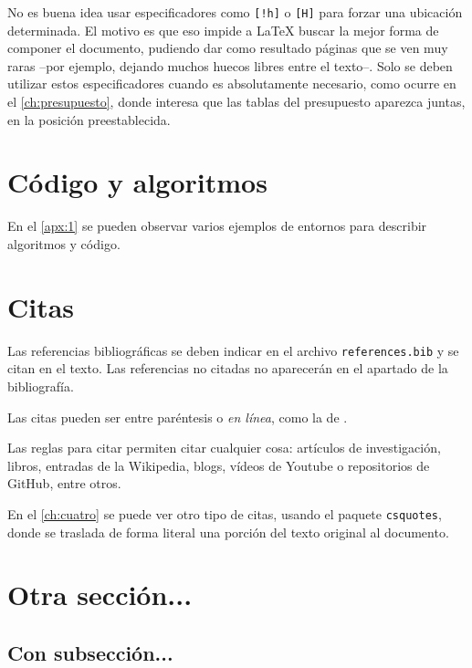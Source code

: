 No es buena idea usar especificadores como \verb|[!h]| o \verb|[H]| para forzar una ubicación determinada. El motivo es que eso impide a \LaTeX{} buscar la mejor forma de componer el documento, pudiendo dar como resultado páginas que se ven muy raras --por ejemplo, dejando muchos huecos libres entre el texto--.
Solo se deben utilizar estos especificadores cuando es absolutamente necesario, como ocurre en el \autoref{ch:presupuesto}, donde interesa que las tablas del presupuesto aparezca juntas, en la posición preestablecida.

\section{Código y algoritmos}

\noindent En el \autoref{apx:1} se pueden observar varios ejemplos de entornos para describir algoritmos y código.

\section{Citas}

\noindent Las referencias bibliográficas se deben indicar en el archivo \texttt{references.bib} y se citan en el texto. Las referencias no citadas no aparecerán en el apartado de la bibliografía.

Las citas pueden ser entre paréntesis \parencite{examplearticle} o \emph{en línea}, como la de \cite{examplegithub}.

Las  reglas para citar \parencite{ulllibguide} permiten citar cualquier cosa: artículos de investigación, libros, entradas de la Wikipedia, blogs, vídeos de Youtube o repositorios de GitHub, entre otros. 

En el \autoref{ch:cuatro} se puede ver otro tipo de citas, usando el paquete \texttt{csquotes}, donde se traslada de forma literal una porción del texto original al documento.
 
\section{Otra sección...}

\noindent \lipsum[1]

\subsection{Con subsección...}

\noindent \lipsum[2]